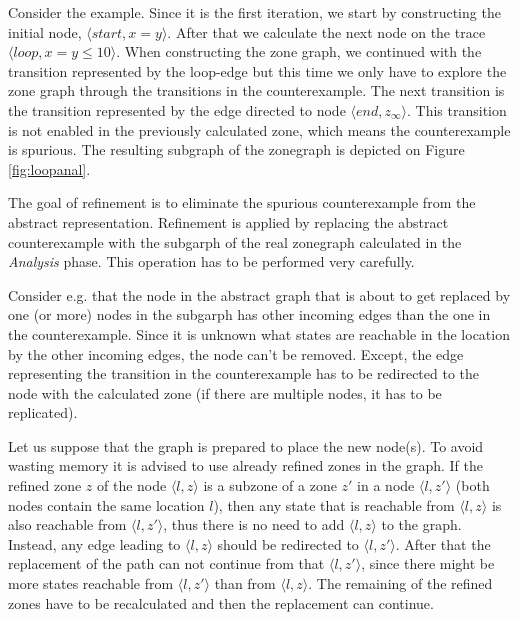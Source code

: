 \begin{example}
	Consider the example. Since it is the first iteration, we start by constructing the initial node, $\langle start, x=y \rangle$. After that we calculate the next node on the trace $\langle loop, x=y \leq 10 \rangle$. When constructing the zone graph, we continued with the transition represented by the loop-edge but this time we only have to explore the zone graph through the transitions in the counterexample. The next transition is the transition represented by the edge directed to node $\langle end, z_\infty \rangle$. This transition is not enabled in the previously calculated zone, which means the counterexample is spurious. The resulting subgraph of the zonegraph is depicted on Figure \ref{fig:loopanal}.
\end{example}

The goal of refinement is to eliminate the spurious counterexample from the abstract representation. Refinement is applied by replacing the abstract counterexample with the subgarph of the real zonegraph calculated in the \emph{Analysis} phase. This operation has to be performed very carefully.

Consider e.g. that the node in the abstract graph that is about to get replaced by one (or more) nodes in the subgarph has other incoming edges than the one in the counterexample. Since it is unknown what states are reachable in the location by the other incoming edges, the node can't be removed. Except, the edge representing the transition in the counterexample has to be redirected to the node with the calculated zone (if there are multiple nodes, it has to be replicated).

Let us suppose that the graph is prepared to place the new node(s). To avoid wasting memory it is advised to use already refined zones in the graph. If the refined zone $z$ of the node $\langle l,z \rangle$ is a subzone of a zone $z'$ in a node $\langle l,z' \rangle$ (both nodes
contain the same location $l$), then any state that is reachable from $\langle l,z \rangle$ is also reachable from $\langle l,z' \rangle$, thus there is no need to add  $\langle l,z \rangle$ to the graph. Instead, any edge leading to  $\langle l,z \rangle$ should be redirected to $\langle l,z' \rangle$. After that the replacement of the path can not continue from that $\langle l,z' \rangle$, since there might be more states reachable from $\langle l,z' \rangle$ than from $\langle l,z \rangle$. The remaining of the refined zones have to be recalculated and then the replacement can continue.

